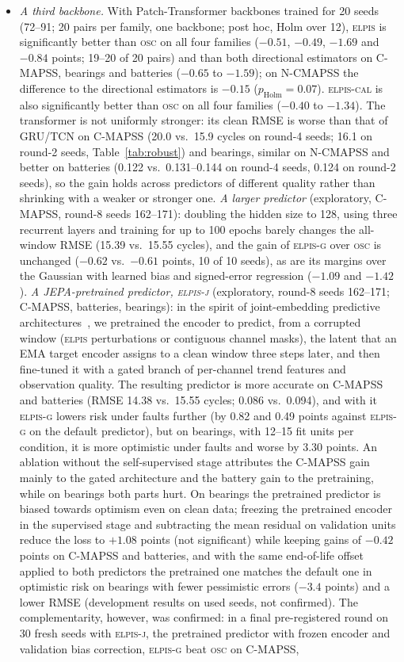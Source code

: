 \documentclass{esannV2}
\newcommand{\OSC}{\textsc{osc}}
\newcommand{\RPT}{\textsc{elpis}}
\newcommand{\AUTO}{\textsc{elpis-cal}}
\newcommand{\AUTOD}{\textsc{elpis-g}}
\newcommand{\EJ}{\textsc{elpis-j}}
\begin{document}
\begin{itemize}
\item \emph{A third backbone}\label{sec:backbone}\emph{.} With Patch-Transformer backbones trained for 20 seeds (72--91; 20 pairs per family, one backbone; post hoc, Holm over 12), \RPT{} is significantly better than \OSC{} on all four families ($-0.51$, $-0.49$, $-1.69$ and $-0.84$ points; 19--20 of 20 pairs) and than both directional estimators on C-MAPSS, bearings and batteries ($-0.65$ to $-1.59$); on N-CMAPSS the difference to the directional estimators is $-0.15$ ($p_{\text{Holm}}=0.07$). \AUTO{} is also significantly better than \OSC{} on all four families ($-0.40$ to $-1.34$). The transformer is not uniformly stronger: its clean RMSE is worse than that of GRU/TCN on C-MAPSS (20.0 vs.\ 15.9 cycles on round-4 seeds; 16.1 on round-2 seeds, Table~\ref{tab:robust}) and bearings, similar on N-CMAPSS and better on batteries (0.122 vs.\ 0.131--0.144 on round-4 seeds, 0.124 on round-2 seeds), so the gain holds across predictors of different quality rather than shrinking with a weaker or stronger one. \emph{A larger predictor} (exploratory, C-MAPSS, round-8 seeds 162--171): doubling the hidden size to 128, using three recurrent layers and training for up to 100 epochs barely changes the all-window RMSE (15.39 vs.\ 15.55 cycles), and the gain of \AUTOD{} over \OSC{} is unchanged ($-0.62$ vs.\ $-0.61$ points, 10 of 10 seeds), as are its margins over the Gaussian with learned bias and signed-error regression ($-1.09$ and $-1.42$). \emph{A JEPA-pretrained predictor, \EJ} (exploratory, round-8 seeds 162--171; C-MAPSS, batteries, bearings): in the spirit of joint-embedding predictive architectures~\cite{assran2023ijepa}, we pretrained the encoder to predict, from a corrupted window (\RPT{} perturbations or contiguous channel masks), the latent that an EMA target encoder assigns to a clean window three steps later, and then fine-tuned it with a gated branch of per-channel trend features and observation quality. The resulting predictor is more accurate on C-MAPSS and batteries (RMSE 14.38 vs.\ 15.55 cycles; 0.086 vs.\ 0.094), and with it \AUTOD{} lowers risk under faults further (by 0.82 and 0.49 points against \AUTOD{} on the default predictor), but on bearings, with 12--15 fit units per condition, it is more optimistic under faults and worse by 3.30 points. An ablation without the self-supervised stage attributes the C-MAPSS gain mainly to the gated architecture and the battery gain to the pretraining, while on bearings both parts hurt. On bearings the pretrained predictor is biased towards optimism even on clean data; freezing the pretrained encoder in the supervised stage and subtracting the mean residual on validation units reduce the loss to $+1.08$ points (not significant) while keeping gains of $-0.42$ points on C-MAPSS and batteries, and with the same end-of-life offset applied to both predictors the pretrained one matches the default one in optimistic risk on bearings with fewer pessimistic errors ($-3.4$ points) and a lower RMSE (development results on used seeds, not confirmed). The complementarity, however, was confirmed: in a final pre-registered round on 30 fresh seeds with \EJ{}, the pretrained predictor with frozen encoder and validation bias correction, \AUTOD{} beat \OSC{} on C-MAPSS, 
\end{itemize}
\end{document}

